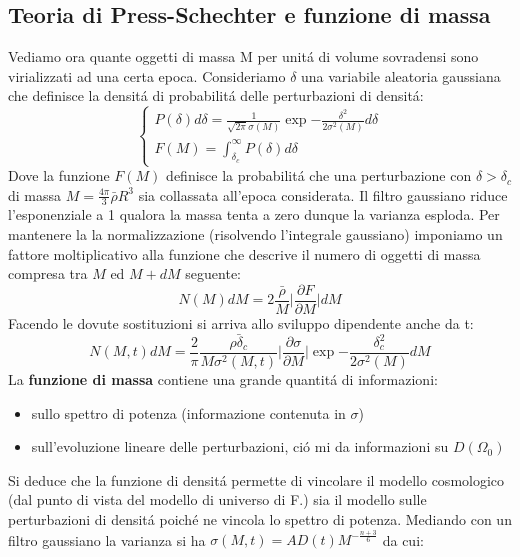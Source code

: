 \documentclass[12pt, a4paper]{article}
\begin{document}
\subsection{Teoria di Press-Schechter e funzione di massa}
Vediamo ora quante oggetti di massa M per unit\'{a} di volume sovradensi sono virializzati ad una certa epoca. Consideriamo $\delta$ una variabile aleatoria gaussiana che definisce la densit\'{a} di probabilit\'{a} delle perturbazioni di densit\'{a}:
\begin{equation}
\begin{cases}
P(\delta)d\delta=\frac{1}{\sqrt{2\pi}\sigma(M)}\exp{-\frac{\delta^2}{2\sigma^2(M)}}d\delta
\\
F(M)=\int_{\delta_c}^{\infty}P(\delta)d\delta
\end{cases}
\end{equation}
Dove la funzione $F(M)$ definisce la probabilit\'{a} che una perturbazione con $\delta>\delta_c$ di massa $M=\frac{4\pi}{3}\bar{\rho} R^3$ sia collassata all'epoca considerata. Il filtro gaussiano riduce l'esponenziale a 1 qualora la massa tenta a zero dunque la varianza esploda. Per mantenere la la normalizzazione (risolvendo l'integrale gaussiano) imponiamo un fattore moltiplicativo alla funzione che descrive il numero di oggetti di massa compresa tra $M$ ed $M+dM$ seguente:
\begin{equation}
N(M) dM=\boxed{2}\frac{\bar{\rho}}{M}\biggl|\frac{\partial F}{\partial M}\biggr| dM
\end{equation}
Facendo le dovute sostituzioni si arriva allo sviluppo dipendente anche da t:
\begin{equation}
N(M,t) dM=\frac{2}{\pi}\frac{\bar{\rho \delta_c}}{M \sigma^2(M,t)}\biggl|\frac{\partial \sigma}{\partial M}\biggr|\exp{-\frac{\delta_c^2}{2\sigma^2(M)}} dM
\end{equation}
La \textbf{funzione di massa} contiene una grande quantit\'{a} di informazioni:
\begin{itemize}
\item sullo spettro di potenza (informazione contenuta in $\sigma$)
\item sull'evoluzione lineare delle perturbazioni, ci\'{o} mi da informazioni su $D(\Omega_0)$
\end{itemize}
Si deduce che la funzione di densit\'{a} permette di vincolare il modello cosmologico (dal punto di vista del modello di universo di F.) sia il modello sulle perturbazioni di densit\'{a} poich\'{e} ne vincola lo spettro di potenza. Mediando con un filtro gaussiano la varianza si ha $\sigma (M,t)=AD(t)M^{-\frac{n+3}{6}}$  da cui:
\end{document}
